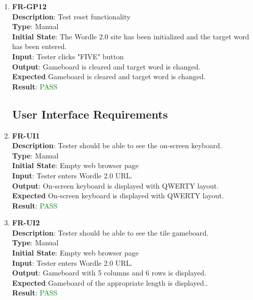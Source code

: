 \documentclass[12pt, titlepage]{article}
\begin{document}
\begin{enumerate}
	\item \textbf{FR-GP12\\}
	\textbf{Description}: Test reset functionality\\
	\textbf{Type}: Manual\\
	\textbf{Initial State}: The Wordle 2.0 site has been initialized and the target word has been entered.\\
	\textbf{Input}: Tester clicks "FIVE" button\\
	\textbf{Output}: Gameboard is cleared and target word is changed.  \\
	\textbf{Expected} Gameboard is cleared and target word is changed.\\
	\textbf{Result}: \textcolor{green}{PASS}\\
	
	\subsection{User Interface Requirements}
	
	\item \textbf{FR-UI1\\}
	\textbf{Description}: Tester should be able to see the on-screen keyboard.\\
	\textbf{Type}: Manual\\
	\textbf{Initial State}: Empty web browser page\\
	\textbf{Input}: Tester enters Wordle 2.0 URL.\\
	\textbf{Output}: On-screen keyboard is displayed with QWERTY layout.  \\
	\textbf{Expected} On-screen keyboard is displayed with QWERTY layout.\\
	\textbf{Result}: \textcolor{green}{PASS}\\
	
	\item \textbf{FR-UI2\\}
	\textbf{Description}: Tester should be able to see the tile gameboard.\\
	\textbf{Type}: Manual\\
	\textbf{Initial State}: Empty web browser page\\
	\textbf{Input}: Tester enters Wordle 2.0 URL.\\
	\textbf{Output}: Gameboard with 5 columns and 6 rows is displayed.  \\
	\textbf{Expected} Gameboard of the appropriate length is displayed..\\
	\textbf{Result}: \textcolor{green}{PASS}\\
	

\end{enumerate}
\end{document}
